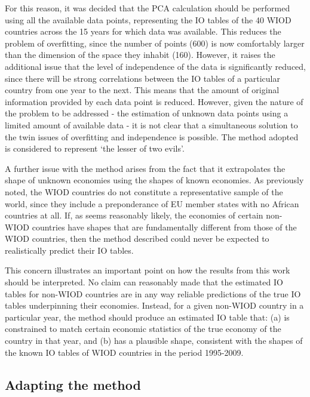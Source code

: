 \documentclass[preprint,authoryear,3p]{elsarticle}
\begin{document}
For this reason, it was decided that the PCA calculation should be performed using all the available data points, representing the IO tables of the 40 WIOD countries across the 15 years for which data was available. This reduces the problem of overfitting, since the number of points (600) is now comfortably larger than the dimension of the space they inhabit (160). However, it raises the additional issue that the level of independence of the data is significantly reduced, since there will be strong correlations between the IO tables of a particular country from one year to the next. This means that the amount of original information provided by each data point is reduced. However, given the nature of the problem to be addressed - the estimation of unknown data points using a limited amount of available data - it is not clear that a simultaneous solution to the twin issues of overfitting and independence is possible. The method adopted is considered to represent `the lesser of two evils'.

A further issue with the method arises from the fact that it extrapolates the shape of unknown economies using the shapes of known economies. As previously noted, the WIOD countries do not constitute a representative sample of the world, since they include a preponderance of EU member states with no African countries at all. If, as seems reasonably likely, the economies of certain non-WIOD countries have shapes that are fundamentally different from those of the WIOD countries, then the method described could never be expected to realistically predict their IO tables.

This concern illustrates an important point on how the results from this work should be interpreted. No claim can reasonably made that the estimated IO tables for non-WIOD countries are in any way reliable predictions of the true IO tables underpinning their economies. Instead, for a given non-WIOD country in a particular year, the method should produce an estimated IO table that: (a) is constrained to match certain economic statistics of the true economy of the country in that year, and (b) has a plausible shape, consistent with the shapes of the known IO tables of WIOD countries in the period 1995-2009.





\subsection{Adapting the method}
\end{document}
